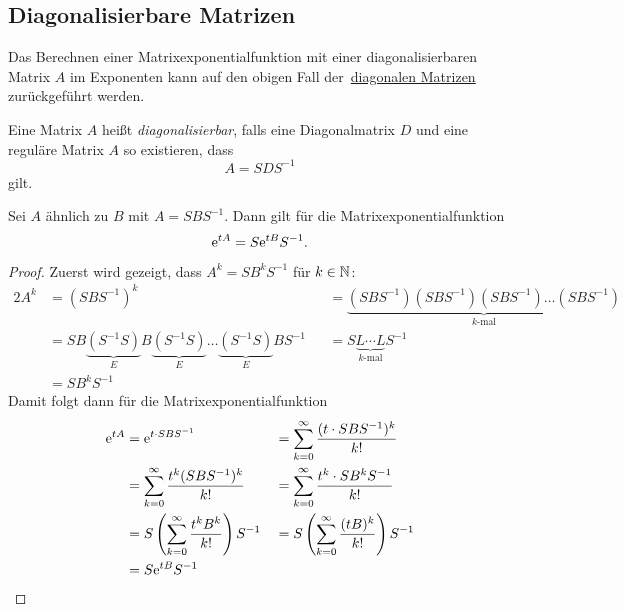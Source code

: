 \subsection{Diagonalisierbare Matrizen}\label{subsec:diagonalisierbare-matrizen}
Das Berechnen einer Matrixexponentialfunktion mit einer diagonalisierbaren Matrix $A$ im Exponenten
kann auf den obigen Fall der~\hyperref[subsec:diagonale-matrizen]{diagonalen Matrizen} zurückgeführt werden.

\begin{definition}[Wiederholung]
    Eine Matrix $A$ heißt \emph{diagonalisierbar}, falls eine Diagonalmatrix $D$ und eine reguläre Matrix $A$ so existieren, dass
    \begin{equation*}
        A = S D S^{-1}
    \end{equation*}
    gilt.
\end{definition}

\begin{lemma}\label{thm:matrixexponential-diagonalisierbar}
    Sei $A$ ähnlich zu $B$ mit $A = S B S^{-1}$.
    Dann gilt für die Matrixexponentialfunktion
    \begin{equation*}
        \mathrm{e}^{t A} = S \mathrm{e}^{t B} S^{-1}.
    \end{equation*}
\end{lemma}

\begin{proof}
    Zuerst wird gezeigt, dass $A^k = S B^k S^{-1}$ für $k \in \mathbb{N}$:
    \begin{alignat*}{2}
        A^k &= (S B S^{-1})^k &&= \underbrace{(S B S^{-1}) (S B S^{-1}) (S B S^{-1}) \dots (S B S^{-1})}_{k \text{-mal}}\\
            &= SB\underbrace{(S^{-1} S)}_{E} B \underbrace{(S^{-1} S)}_{E} \dots \underbrace{(S^{-1} S)}_{E} B S^{-1}
                &&= S \underbrace{L \cdots L}_{k \text{-mal}} S^{-1}\\
            &= S B^k S^{-1}
    \end{alignat*}
    Damit folgt dann für die Matrixexponentialfunktion
    \begin{alignat*}{2}
        \mathrm{e}^{t A} &= \mathrm{e}^{t \cdot S B S^{-1}} &&= \sum^\infty_{k=0} \frac{(t \cdot S B S^{-1})^k}{k!}\\
                 &= \sum^\infty_{k=0} \frac{t^k (S B S^{-1})^k}{k!} &&= \sum^\infty_{k=0} \frac{t^k \cdot S B^k S^{-1}}{k!}\\
                 &= S \left( \sum^\infty_{k=0} \frac{t^k B^k}{k!} \right) S^{-1} &&= S \left( \sum^\infty_{k=0} \frac{(t B)^k}{k!} \right) S^{-1}\\
                 &= S \mathrm{e}^{t B} S^{-1}
    \end{alignat*}
\end{proof}

